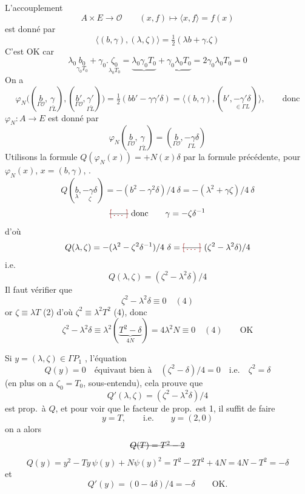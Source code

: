 \documentclass[11pt,a4paper]{article}
\begin{document}
L'accouplement
\[
  A \times E \longrightarrow \mathcal{O} \qquad (x, f) \longmapsto \langle x, f\rangle = f(x)
\]
est donné par
\[
  \boxed{\langle (b, \gamma), (\lambda, \zeta) \rangle = \tfrac{1}{2}(\lambda b + \gamma.\zeta)}
\]
C'est OK car
\[
  \lambda_{0}\underset{\gamma_{0}T_{0}}{b_{0}} + \gamma_{0}.\underset{\lambda_{0}T_{0}}{\zeta_{0}}
  = \underbrace{\lambda_{0}\gamma_{0}T_{0}}_{} + \underbrace{\gamma_{0}\lambda_{0}T_{0}}_{}
  = 2\gamma_{0}\lambda_{0}T_{0} = 0
\]
On a
\[
  \varphi_{N}\bigl((\underset{\Gamma\mathcal{O}}{b}, \underset{\Gamma\check{L}}{\gamma}), (\underset{\Gamma\mathcal{O}}{b'}, \underset{\Gamma\check{L}}{\gamma'})\bigr)
  = \tfrac{1}{2}(bb' - \gamma\gamma'\delta)
  = \bigl\langle (b, \gamma), (b', \underset{\in \Gamma L}{-\gamma'\delta}) \bigr\rangle,
  \qquad\text{donc}
\]
$\varphi_{N} : A \to E$ est donné par
\[
  \boxed{\varphi_{N}(\underset{\Gamma\mathcal{O}}{b}, \underset{\Gamma\check{L}}{\gamma}) = (\underset{\Gamma\mathcal{O}}{b}, \underset{\Gamma L}{-\gamma\delta})}
\]
 Utilisons la formule $Q(\varphi_{N}(x)) = +N(x)\delta$ par la formule précédente, pour $\varphi_{N}(x)$, $x = (b, \gamma)$, \struck{\ill{}}.
\[
  Q(\underset{\lambda}{b}, \underset{\zeta}{-\gamma\delta}) = - (b^{2} - \gamma^{2}\delta)/4\ \delta
  = - (\lambda^{2} + \gamma\zeta)/4\ \delta
\]
\[
  \text{\struck{\ill{}}}\ \text{donc} \qquad \gamma = -\zeta\delta^{-1}
\]
d'où
\[
  Q(\lambda, \zeta) = - (\lambda^{2} - \zeta^{2}\delta^{-1})/4\ \delta
  = \text{\struck{\ill{}}}\ (\zeta^{2} - \lambda^{2}\delta)/4
\]
i.e.
\[
  \boxed{Q(\lambda, \zeta) = (\zeta^{2} - \lambda^{2}\delta)/4}
\]
Il faut vérifier que
\[
  \zeta^{2} - \lambda^{2}\delta \equiv 0 \quad (4)
\]
or $\zeta \equiv \lambda T$ (2) d'où $\zeta^{2} \equiv \lambda^{2}T^{2}$ (4), donc
\[
  \zeta^{2} - \lambda^{2}\delta \equiv \lambda^{2}(\underbrace{T^{2} - \delta}_{4N}) = 4\lambda^{2}N \equiv 0 \quad (4) \qquad \text{OK}
\]


Si $y = (\lambda, \zeta) \in \Gamma P_{1}$ , l'équation
\[
  Q(y) = 0 \quad\text{équivaut bien à}\quad (\zeta^{2} - \delta)/4 = 0 \quad\text{i.e.}\quad \zeta^{2} = \delta
\]
(en plus on a $\zeta_{0} = T_{0}$, sous-entendu), cela prouve que
\[
  Q'(\lambda, \zeta) = (\zeta^{2} - \lambda^{2}\delta)/4
\]
est prop.\ à $Q$, et pour voir que le facteur de prop.\ est 1, il suffit de faire 
\[
  y = T, \qquad\text{i.e.}\qquad y = (2, 0)
\]
on a alors
\[
  \text{\struck{$Q(T) = T^{2} - 2$}}
\]
\[
  Q(y) = y^{2} - Ty\,\psi(y) + N\psi(y)^{2} = T^{2} - 2T^{2} + 4N = 4N - T^{2} = -\delta
\]
et
\[
  Q'(y) = (0 - 4\delta)/4 = -\delta \qquad \text{OK.}
\]
\end{document}
